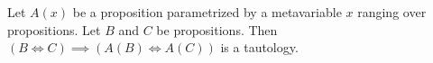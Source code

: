 \begin{node}\label{prop-000C}%
Let $A(x)$ be a proposition parametrized by a metavariable $x$ ranging
over propositions.
Let $B$ and $C$ be propositions. Then $(B\iff C)\implies(A(B)\iff A(C))$
is a tautology.
\end{node}